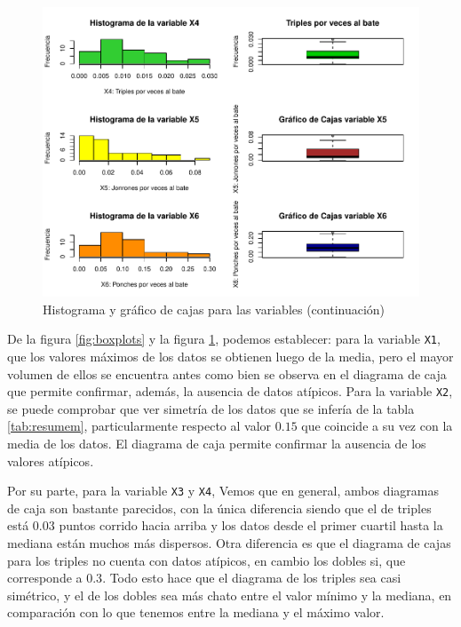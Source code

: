 \documentclass{staprojteamusb}
\begin{document}
 \begin{figure}
 \centering
 \includegraphics{C03322-InformeFinal-Cordero-Gavazut-Riera_files/figure-latex/boxplots2-1.pdf}
 \caption{\label{fig:boxplots2}Histograma y gráfico de cajas para las variables (continuación)}
 \end{figure}

 De la figura \ref{fig:boxplots} y la figura \ref{fig:boxplots2}, podemos establecer: para la variable \texttt{X1}, que los valores máximos de los datos se obtienen luego de la media, pero el mayor volumen de ellos se encuentra antes como bien se observa en el diagrama de caja que permite confirmar, además, la ausencia de datos atípicos. Para la variable \texttt{X2}, se puede comprobar que ver simetría de los datos que se infería de la tabla \ref{tab:resumem}, particularmente respecto al valor \(0.15\) que coincide a su vez con la media de los datos. El diagrama de caja permite confirmar la ausencia de los valores atípicos.

 Por su parte, para la variable \texttt{X3} y \texttt{X4}, Vemos que en general, ambos diagramas de caja son bastante parecidos, con la única diferencia siendo que el de triples está \(0.03\) puntos corrido hacia arriba y los datos desde el primer cuartil hasta la mediana están muchos más dispersos. Otra diferencia es que el diagrama de cajas para los triples no cuenta con datos atípicos, en cambio los dobles si, que corresponde a \(0.3\). Todo esto hace que el diagrama de los triples sea casi simétrico, y el de los dobles sea más chato entre el valor mínimo y la mediana, en comparación con lo que tenemos entre la mediana y el máximo valor.
\end{document}
